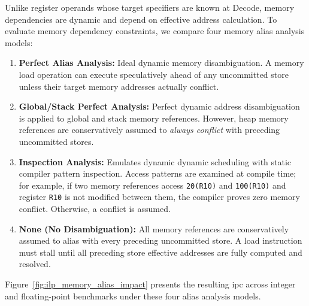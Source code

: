 Unlike register operands whose target specifiers are known at Decode, memory dependencies are dynamic and depend on effective address calculation. To evaluate memory dependency constraints, we compare four memory alias analysis models:
\begin{enumerate}
    \item \textbf{Perfect Alias Analysis:} Ideal dynamic memory disambiguation. A memory load operation can execute speculatively ahead of any uncommitted store unless their target memory addresses actually conflict.
    \item \textbf{Global/Stack Perfect Analysis:} Perfect dynamic address disambiguation is applied to global and stack memory references. However, heap memory references are conservatively assumed to \textit{always conflict} with preceding uncommitted stores.
    \item \textbf{Inspection Analysis:} Emulates dynamic dynamic scheduling with static compiler pattern inspection. Access patterns are examined at compile time; for example, if two memory references access \texttt{20(R10)} and \texttt{100(R10)} and register \texttt{R10} is not modified between them, the compiler proves zero memory conflict. Otherwise, a conflict is assumed.
    \item \textbf{None (No Disambiguation):} All memory references are conservatively assumed to alias with every preceding uncommitted store. A load instruction must stall until all preceding store effective addresses are fully computed and resolved.
\end{enumerate}

Figure~\ref{fig:ilp_memory_alias_impact} presents the resulting \gls{ipc} across integer and floating-point benchmarks under these four alias analysis models.

